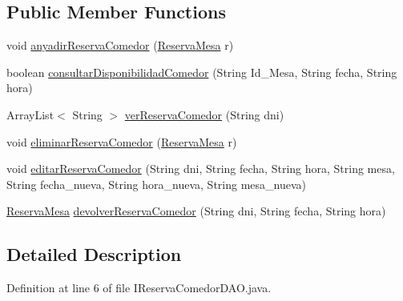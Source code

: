 \subsection*{Public Member Functions}
\begin{DoxyCompactItemize}
\item 
void \mbox{\hyperlink{interfacees_1_1deusto_1_1spq_1_1biblioteca_1_1dao_1_1_i_reserva_comedor_d_a_o_a049782a184cf43fcead41207aaf91e0b}{anyadir\+Reserva\+Comedor}} (\mbox{\hyperlink{classes_1_1deusto_1_1spq_1_1biblioteca_1_1data_1_1_reserva_mesa}{Reserva\+Mesa}} r)
\item 
boolean \mbox{\hyperlink{interfacees_1_1deusto_1_1spq_1_1biblioteca_1_1dao_1_1_i_reserva_comedor_d_a_o_aab673a0f8b0df9792d97189f934641af}{consultar\+Disponibilidad\+Comedor}} (String Id\+\_\+\+Mesa, String fecha, String hora)
\item 
Array\+List$<$ String $>$ \mbox{\hyperlink{interfacees_1_1deusto_1_1spq_1_1biblioteca_1_1dao_1_1_i_reserva_comedor_d_a_o_ae20ad98f69700d0c47c0cb274e1f0e33}{ver\+Reserva\+Comedor}} (String dni)
\item 
void \mbox{\hyperlink{interfacees_1_1deusto_1_1spq_1_1biblioteca_1_1dao_1_1_i_reserva_comedor_d_a_o_ab135ff48fa3d6c4ea1c4bf78405b96f4}{eliminar\+Reserva\+Comedor}} (\mbox{\hyperlink{classes_1_1deusto_1_1spq_1_1biblioteca_1_1data_1_1_reserva_mesa}{Reserva\+Mesa}} r)
\item 
void \mbox{\hyperlink{interfacees_1_1deusto_1_1spq_1_1biblioteca_1_1dao_1_1_i_reserva_comedor_d_a_o_af50553820cb529bd993f64c6496f6e2c}{editar\+Reserva\+Comedor}} (String dni, String fecha, String hora, String mesa, String fecha\+\_\+nueva, String hora\+\_\+nueva, String mesa\+\_\+nueva)
\item 
\mbox{\hyperlink{classes_1_1deusto_1_1spq_1_1biblioteca_1_1data_1_1_reserva_mesa}{Reserva\+Mesa}} \mbox{\hyperlink{interfacees_1_1deusto_1_1spq_1_1biblioteca_1_1dao_1_1_i_reserva_comedor_d_a_o_a8e5a8ca90742ac0fc9231341e3a4fc5e}{devolver\+Reserva\+Comedor}} (String dni, String fecha, String hora)
\end{DoxyCompactItemize}


\subsection{Detailed Description}


Definition at line 6 of file I\+Reserva\+Comedor\+D\+A\+O.\+java.



